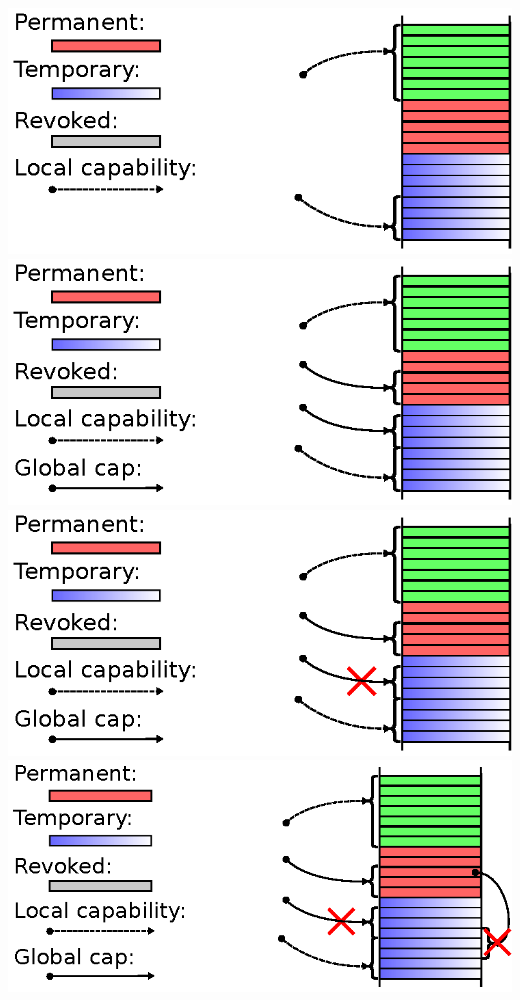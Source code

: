 \documentclass{beamer}
\begin{document}
\begin{frame}
\begin{overprint}
    \includegraphics{Worlds/w8.eps}
    \includegraphics{Worlds/w9.eps}
    \includegraphics{Worlds/w10.eps}
    \includegraphics{Worlds/w11.eps}

\end{overprint}
\end{frame}
\end{document}
